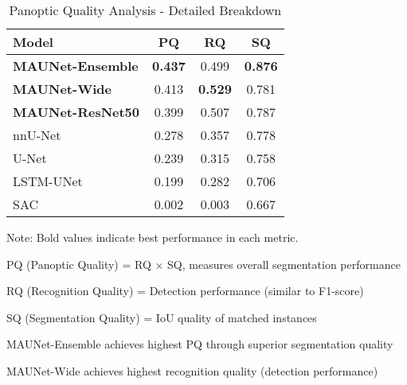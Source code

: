 \begin{table}[htbp]
\centering
\caption{Panoptic Quality Analysis - Detailed Breakdown}
\label{tab:panoptic_quality}
\begin{tabular}{lccc}
\toprule
\textbf{Model} & \textbf{PQ} & \textbf{RQ} & \textbf{SQ} \\
\midrule
\textbf{MAUNet-Ensemble} & \textbf{0.437} & 0.499 & \textbf{0.876} \\
\textbf{MAUNet-Wide} & 0.413 & \textbf{0.529} & 0.781 \\
\textbf{MAUNet-ResNet50} & 0.399 & 0.507 & 0.787 \\
nnU-Net & 0.278 & 0.357 & 0.778 \\
U-Net & 0.239 & 0.315 & 0.758 \\
LSTM-UNet & 0.199 & 0.282 & 0.706 \\
SAC & 0.002 & 0.003 & 0.667 \\
\bottomrule
\end{tabular}
\begin{tablenotes}
\small
\item Note: Bold values indicate best performance in each metric.
\item PQ (Panoptic Quality) = RQ × SQ, measures overall segmentation performance
\item RQ (Recognition Quality) = Detection performance (similar to F1-score)
\item SQ (Segmentation Quality) = IoU quality of matched instances
\item MAUNet-Ensemble achieves highest PQ through superior segmentation quality
\item MAUNet-Wide achieves highest recognition quality (detection performance)
\end{tablenotes}
\end{table}
